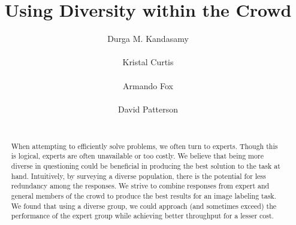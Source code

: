 \documentclass{chi2012}
\newcommand{\tab}{\hspace*{2em}}
\begin{document}
\setlength{\paperheight}{11in}
\setlength{\paperwidth}{8.5in}
\setlength{\pdfpageheight}{\paperheight}
\setlength{\pdfpagewidth}{\paperwidth}


\title{Using Diversity within the Crowd}
\author{
  \alignauthor Durga M. Kandasamy\\
    \\
  \alignauthor Kristal Curtis\\
    \\
      \alignauthor Armando Fox\\
    \\
      \alignauthor David Patterson\\
    \\
}

\maketitle

\begin{abstract}
\tab When attempting to efficiently solve problems, we often turn to experts. Though this is logical, experts are often unavailable or too costly. We believe that being more diverse in questioning could be beneficial in producing the best solution to the task at hand. Intuitively, by surveying a diverse population, there is the potential for less redundancy among the responses. We strive to combine responses from expert and general members of the crowd to produce the best results for an image labeling task. We found that using a diverse group, we could approach (and sometimes exceed) the performance of the expert group while achieving better throughput for a lesser cost. 
\end{abstract}
\end{document}
